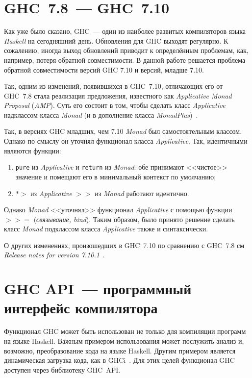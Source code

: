 \section{GHC~7.8~--- GHC~7.10}\label{710}
Как уже было сказано, GHC~--- один из наиболее развитых компиляторов языка \textit{Haskell} на сегодняшний день. Обновления для GHC выходят регулярно. К сожалению, иногда выход обновлений приводит к определённым проблемам, как, например, потеря обратной совместимости. В данной работе решается проблема обратной совместимости версий GHC 7.10 и версий, младше 7.10.

Так, одним из изменений, появившихся в GHC~7.10, отличающих его от GHC~7.8 стала реализация предложения, известного как \textit{Applicative Monad Proposal} (\textit{AMP}). Суть его состоит в том, чтобы сделать класс \textit{Applicative} надклассом класса \textit{Monad} (и в дополнение класса \textit{MonadPlus})~\autocite{AMP}.

Так, в версиях GHC младших, чем 7.10 \textit{Monad} был самостоятельным классом. Однако по смыслу он уточнял функционал класса \textit{Applicative}. Так, идентичными являются функции:
\begin{enumerate}[1)]
\item \lstinline{pure} из \textit{Applicative} и \lstinline{return} из \textit{Monad}: обе принимают <<чистое>> значение и помещают его в минимальный контекст по умолчанию;
\item \textbf{$*>$} из \textit{Applicative} \textbf{$>>$} из \textit{Monad} работают идентично.
\end{enumerate}
Однако \textit{Monad} <<уточнял>> функционал \textit{Applicative} с помощью функции \textbf{$>>=$} (\textit{связывание, bind}). Таким образом, было принято решение сделать класс \textit{Monad} подклассом класса \textit{Applicative} также и синтаксически.

О других изменениях, произошедших в GHC~7.10 по сравнению с GHC~7.8 см \textit{Release notes for version 7.10.1}~\autocite{release}.


\section{GHC API~--- программный интерфейс компилятора}\label{ghcapi}
Функционал GHC может быть использован не только для компиляции программ на языке Haskell. Важным примером использования может послужить анализ и, возможно, преобразование кода на языке Haskell. Другим примером является динамическая загрузка кода, как в GHCi~\autocite{GHClib}. Для этих целей функционал GHC доступен через библиотеку GHC~API.

